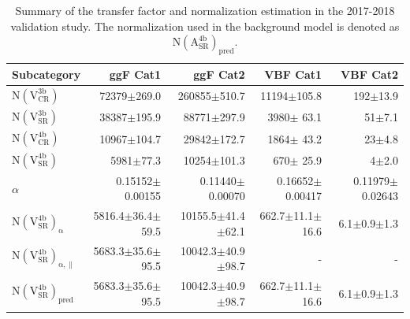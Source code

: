 \begin{table}[htb]
\caption[Summary of the transfer factor and normalization estimation in the 2017-2018 validation test]{\label{bkg:tab:valfactor2}Summary of the transfer factor and normalization estimation in the 2017-2018 validation study. The normalization used in the background model is denoted as $\mathrm{N(A_{SR}^{4b})_{pred}}$.}
\small
\centering
\begin{tabularx}{\textwidth}{l r r r r}
    \hline
    Subcategory                                  &   ggF Cat1               & ggF Cat2                & VBF Cat1                  & VBF Cat2              \\
    \hline
    $\mathrm{N(V_{CR}^{3b})}$                    &  72379$\pm$269.0         & 260855$\pm$510.7        & 11194$\pm$105.8           &    192$\pm$13.9       \\
    $\mathrm{N(V_{SR}^{3b})}$                    &  38387$\pm$195.9         &  88771$\pm$297.9        &  3980$\pm$ 63.1           &     51$\pm$7.1        \\
    $\mathrm{N(V_{CR}^{4b})}$                    &  10967$\pm$104.7         &  29842$\pm$172.7        &  1864$\pm$ 43.2           &     23$\pm$4.8        \\
    $\mathrm{N(V_{SR}^{4b})}$                    &   5981$\pm$77.3          &  10254$\pm$101.3        &   670$\pm$ 25.9           &      4$\pm$2.0        \\    
    $\alpha$                                     & 0.15152$\pm$0.00155      &0.11440$\pm$0.00070      &0.16652$\pm$0.00417        &0.11979$\pm$0.02643    \\
    $\mathrm{N(V_{SR}^{4b})_{\alpha}}$           &  5816.4$\pm$36.4$\pm$59.5&10155.5$\pm$41.4$\pm$62.1&  662.7$\pm$11.1$\pm$16.6  &    6.1$\pm$0.9$\pm$1.3\\
    $\mathrm{N(V_{SR}^{4b})_{\alpha,\parallel}}$ &  5683.3$\pm$35.6$\pm$95.5&10042.3$\pm$40.9$\pm$98.7&         -                 &         -             \\
    $\mathrm{N(V_{SR}^{4b})_{pred}}$             &  5683.3$\pm$35.6$\pm$95.5&10042.3$\pm$40.9$\pm$98.7&  662.7$\pm$11.1$\pm$16.6  &    6.1$\pm$0.9$\pm$1.3\\
    \hline
\end{tabularx}
\end{table}

